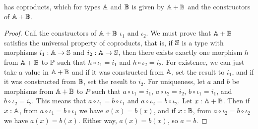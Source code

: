 \documentclass[../../math.tex]{subfiles}
\begin{document}
\begin{theorem}
    \Type has coproducts, which for types $\A$ and $\B$ is given by $\A + \B$
    and the constructors of $\A + \B$.
\end{theorem}
\begin{proof}
    Call the constructors of $\A + \B$ $\iota_1$ and $\iota_2$.  We must prove
    that $\A + \B$ satisfies the universal property of coproducts, that is, if
    $\S$ is a type with morphisms $i_1 : \A \to \S$ and $i_2 : \A \to \S$, then
    there exists exactly one morphism $h$ from $\A + \B$ to $\P$ such that $h
    \circ \iota_1 = i_1$ and $h \circ \iota_2 = i_2$.  For existence, we can
    just take a value in $\A + \B$ and if it was constructed from $\A$, set the
    result to $i_1$, and if it was constructed from $\B$, set the result to
    $i_2$.  For uniqueness, let $a$ and $b$ be morphisms from $\A + \B$ to $P$
    such that $a \circ \iota_1 = i_1$, $a \circ \iota_2 = i_2$, $b \circ \iota_1
    = i_1$, and $b \circ \iota_2 = i_2$.  This means that $a \circ \iota_1 = b
    \circ \iota_1$ and $a \circ \iota_2 = b \circ \iota_2$.  Let $x : \A + \B$.
    Then if $x : \A$, from $a \circ \iota_1 = b \circ \iota_1$ we have $a(x) =
    b(x)$, and if $x : \B$, from $a \circ \iota_2 = b\circ \iota_2$ we have
    $a(x) = b(x)$.  Either way, $a(x) = b(x)$, so $a = b$.
\end{proof}
\end{document}
